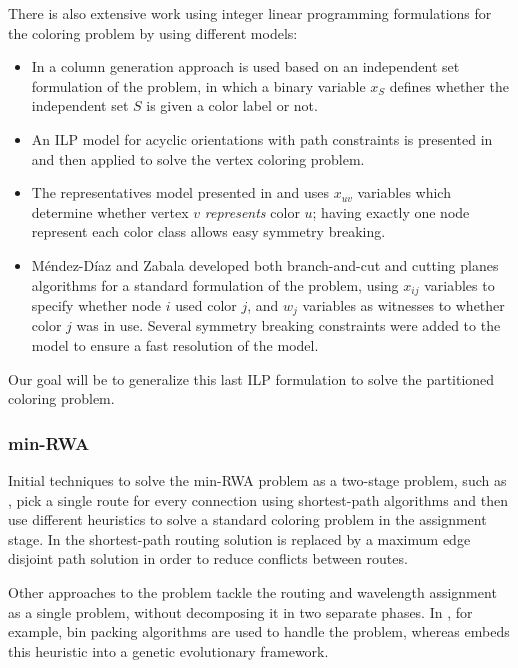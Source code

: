 There is also extensive work using integer linear programming formulations for the coloring problem by using different models:
\begin{itemize}
\item{In \cite{mehrotra1996column} a column generation approach is used based on an independent set formulation of the problem, in which a binary variable $x_S$ defines whether the independent set $S$ is given a color label or not.}
\item{An ILP model for acyclic orientations with path constraints is presented in \cite{figueiredo2005acyclic} and then applied to solve the vertex coloring problem.}
\item{The representatives model presented in \cite{campelo2004cliques} and \cite{campelo2008asymmetric} uses $x_{uv}$ variables which determine whether vertex $v$ \textit{represents} color $u$; having exactly one node represent each color class allows easy symmetry breaking.}
\item{M\'endez-D\'iaz and Zabala \cite{mendez2006branch,mendez2008cutting} developed both branch-and-cut and cutting planes algorithms for a standard formulation of the problem, using $x_{ij}$ variables to specify whether node $i$ used color $j$, and $w_j$ variables as witnesses to whether color $j$ was in use. Several symmetry breaking constraints were added to the model to ensure a fast resolution of the model.}
\end{itemize}

Our goal will be to generalize this last ILP formulation to solve the partitioned coloring problem.

\subsubsection*{min-RWA}

Initial techniques to solve the min-RWA problem as a two-stage problem, such as \cite{hyytia14wavelength}, pick a single route for every connection using shortest-path algorithms and then use different heuristics to solve a standard coloring problem in the assignment stage. In \cite{manohar2002routing} the shortest-path routing solution is replaced by a maximum edge disjoint path solution in order to reduce conflicts between routes.

Other approaches to the problem tackle the routing and wavelength assignment as a single problem, without decomposing it in two separate phases. In \cite{skorin2007routing}, for example, bin packing algorithms are used to handle the problem, whereas \cite{noronha2007random} embeds this heuristic into a genetic evolutionary framework.

